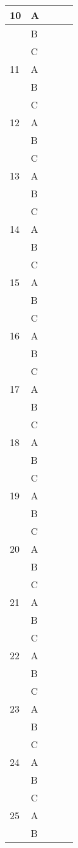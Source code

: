 \documentclass[12pt]{article}
\begin{document}
\begin{longtable}{ | p{1cm} | p{1cm} | p{3cm} | p{4cm} | p{4cm} | }
\hline
10&A&&&\\
\hline
&B&&&\\
\hline
&C&&&\\
\hline
11&A&&&\\
\hline
&B&&&\\
\hline
&C&&&\\
\hline
12&A&&&\\
\hline
&B&&&\\
\hline
&C&&&\\
\hline
13&A&&&\\
\hline
&B&&&\\
\hline
&C&&&\\
\hline
14&A&&&\\
\hline
&B&&&\\
\hline
&C&&&\\
\hline
15&A&&&\\
\hline
&B&&&\\
\hline
&C&&&\\
\hline
16&A&&&\\
\hline
&B&&&\\
\hline
&C&&&\\
\hline
17&A&&&\\
\hline
&B&&&\\
\hline
&C&&&\\
\hline
18&A&&&\\
\hline
&B&&&\\
\hline
&C&&&\\
\hline
19&A&&&\\
\hline
&B&&&\\
\hline
&C&&&\\
\hline
20&A&&&\\
\hline
&B&&&\\
\hline
&C&&&\\
\hline
21&A&&&\\
\hline
&B&&&\\
\hline
&C&&&\\
\hline
22&A&&&\\
\hline
&B&&&\\
\hline
&C&&&\\
\hline
23&A&&&\\
\hline
&B&&&\\
\hline
&C&&&\\
\hline
24&A&&&\\
\hline
&B&&&\\
\hline
&C&&&\\
\hline
25&A&&&\\
\hline
&B&&&\\

\end{longtable}
\end{document}
